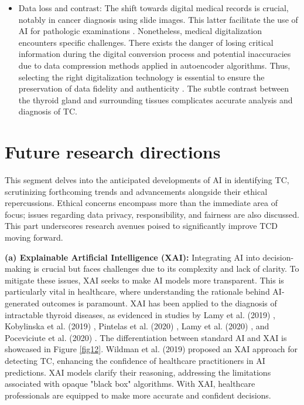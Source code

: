\documentclass[a4paper,fleqn]{cas-sc}
\begin{document}
\begin{itemize}[leftmargin=*]
\item Data loss and contrast: The shift towards digital medical records is crucial, notably in cancer diagnosis using slide images. This latter facilitate the use of \ac{AI} for pathologic examinations \cite{dov2019thyroid}. Nonetheless, medical digitalization encounters specific challenges. There exists the danger of losing critical information during the digital conversion process and potential inaccuracies due to data compression methods applied in autoencoder algorithms. Thus, selecting the right digitalization technology is essential to ensure the preservation of data fidelity and authenticity \cite{dovai,halicek2019head}.  The subtle contrast between the thyroid gland and surrounding tissues complicates accurate analysis and diagnosis of TC.


\end{itemize}



\section{Future research directions} \label{sec8}
This segment delves into the anticipated developments of \ac{AI} in identifying TC, scrutinizing forthcoming trends and advancements alongside their ethical repercussions. Ethical concerns encompass more than the immediate area of focus; issues regarding data privacy, responsibility, and fairness are also discussed. This part underscores research avenues poised to significantly improve \ac{TCD} moving forward.

\vskip2mm
\noindent \textbf{(a) Explainable Artificial Intelligence (XAI): } 
Integrating AI into decision-making is crucial but faces challenges due to its complexity and lack of clarity. To mitigate these issues, \ac{XAI} seeks to make AI models more transparent. This is particularly vital in healthcare, where understanding the rationale behind AI-generated outcomes is paramount. \ac{XAI} has been applied to the diagnosis of intractable thyroid diseases, as evidenced in studies by Lamy et al. (2019) \cite{lamy2019explainable}, Kobylinska et al. (2019) \cite{kobylinska2019explainable}, Pintelas et al. (2020) \cite{pintelas2020explainable}, Lamy et al. (2020) \cite{lamy2020intelligence}, and Poceviciute et al. (2020) \cite{poceviciute2020survey}. The differentiation between standard AI and \ac{XAI} is showcased in Figure \ref{fig12}. Wildman et al. (2019) \cite{wildman2019using} proposed an \ac{XAI} approach for detecting \ac{TC}, enhancing the confidence of healthcare practitioners in AI predictions. \ac{XAI} models clarify their reasoning, addressing the limitations associated with opaque "black box" algorithms. With \ac{XAI}, healthcare professionals are equipped to make more accurate and confident decisions.\\
\end{document}
